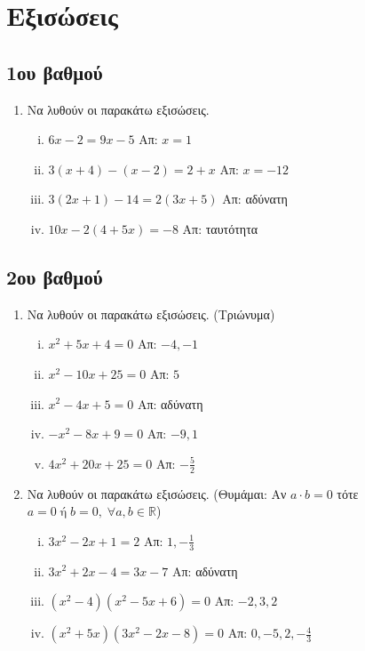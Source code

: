 \section*{Εξισώσεις}

\subsection*{1ου βαθμού}

\begin{enumerate}
  \item  Να λυθούν οι παρακάτω εξισώσεις.
    \begin{enumerate}[i)]
      \item $ 6x-2=9x-5 $ \hfill Απ: $ x=1 $
      \item $ 3(x+4)-(x-2) = 2+x $ \hfill Απ: $ x=-12 $ 
      \item $ 3(2x+1) - 14 = 2(3x+5) $ \hfill Απ: αδύνατη 
      \item $ 10x-2(4+5x) =-8 $ \hfill Απ: ταυτότητα 
    \end{enumerate}
\end{enumerate}

\subsection*{2ου βαθμού}

\begin{enumerate}
  \item  Να λυθούν οι παρακάτω εξισώσεις. (\textcolor{Col1}{Τριώνυμα})
    \begin{enumerate}[i)]
      \item $ x^{2} + 5x + 4 = 0 $ \hfill Απ:  $ -4, -1 $
      \item $ x^{2} - 10x + 25 = 0 $ \hfill Απ: $ 5 $
      \item $ x^{2} - 4x + 5 = 0 $ \hfill Απ:  αδύνατη
      \item $ -x^{2} - 8x + 9 = 0 $ \hfill Απ: $ -9, 1 $
      \item $ 4x^{2} + 20x + 25 = 0 $ \hfill Απ: $ - \frac{5}{2} $ 
    \end{enumerate}

  \item Να λυθούν οι παρακάτω εξισώσεις. (\textcolor{Col1}{Θυμάμαι:} Αν $ a\cdot b=0 $
    τότε $a=0 \; \text{ή} \; b=0 , \; \forall a,b \in \mathbb{R} $)
    \begin{enumerate}[i)]
      \item $ 3x^{2} - 2x + 1 = 2 $ \hfill Απ: $ 1, - \frac{1}{3} $  
      \item $ 3x^{2} + 2x - 4 = 3x - 7 $ \hfill Απ:  αδύνατη
      \item $ (x^{2} - 4)(x^{2} - 5x + 6) = 0 $ \hfill Απ: $ -2, 3, 2 $ 
      \item $ (x^{2} + 5x)(3x^{2} - 2x - 8) = 0 $ \hfill Απ: $ 0, -5, 2, -\frac{4}{3} $
    \end{enumerate}
\end{enumerate}


